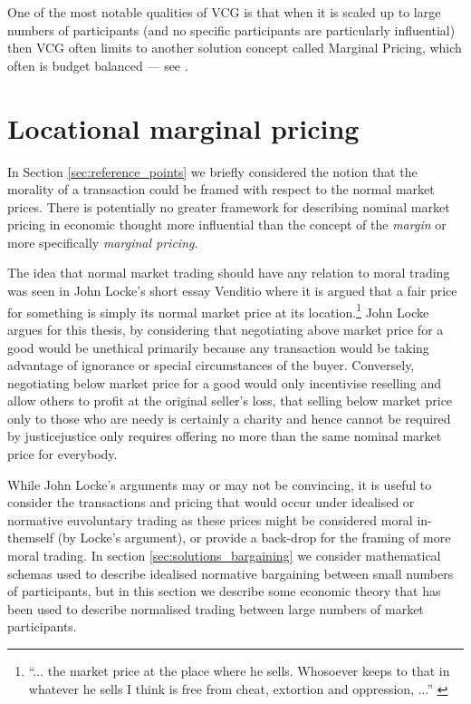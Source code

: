 One of the most notable qualities of VCG is that when it is scaled up to large numbers of participants (and no specific participants are particularly influential) then VCG often limits to another solution concept called \DIFdelbegin {}\DIFdelend \DIFaddbegin {}\DIFaddend Marginal Pricing, which often is budget balanced --- see \cite{NATH2019673, 8430852}.


\section{Locational marginal pricing}\label{sec:solutions_LMP}

In Section \ref{sec:reference_points} we briefly considered the notion that %
the morality of a transaction could be framed with respect to the normal market prices.
There is potentially no greater framework for describing nominal market pricing in economic thought more influential than the concept of the \textit{margin} or more specifically \textit{marginal pricing}.

The idea that normal market trading should have any relation to moral trading was seen in John Locke's short essay Venditio where it is argued that a fair price for something is simply its normal market price at its location.\footnote{``... the market price at the place where he sells. Whosoever keeps to that in whatever he sells I think is free from cheat, extortion and oppression, ...'' \citep{locke2003locke}}
John Locke argues for this thesis, by considering that negotiating above market price for a good would be unethical primarily because any transaction would be taking advantage of ignorance or special circumstances of the buyer.
Conversely, negotiating below market price for a good would only incentivise reselling and allow others to profit at the original seller's loss\DIFdelbegin {}\DIFdelend \DIFaddbegin {}\DIFaddend , that selling below market price only to those who are needy is certainly a charity and hence cannot be required by justice\DIFdelbegin {}\DIFdelend \DIFaddbegin {}\DIFaddend justice only requires offering no more than the same nominal market price for everybody.

While John Locke's arguments may or may not be convincing, it is useful to consider the transactions and pricing that would occur under idealised or normative euvoluntary trading as these prices might be considered moral in-themself (by Locke's argument), or provide a back-drop for the framing of more moral trading.
In section \ref{sec:solutions_bargaining} we consider mathematical schemas used to describe idealised normative bargaining between small numbers of participants, but in this section we describe some economic theory that has been used to describe normalised trading between large numbers of market participants.

